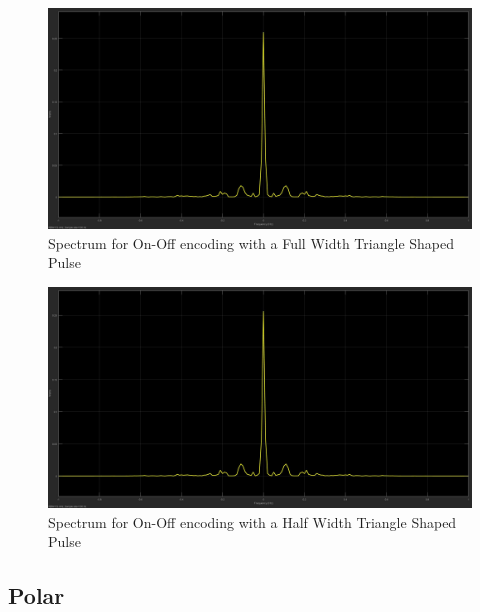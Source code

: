 \documentclass{article}
\begin{document}
\begin{figure}[H]
  \includegraphics[width = \linewidth]{OO_Tri_F_Spectrum.jpg}
  \caption{Spectrum for On-Off encoding with a Full Width Triangle Shaped Pulse}
  \label{fig:OO-Tri-F-Spectrum}
\end{figure}
\begin{figure}[H]
  \includegraphics[width = \linewidth]{OO_Tri_H_Spectrum.jpg}
  \caption{Spectrum for On-Off encoding with a Half Width Triangle Shaped Pulse}
  \label{fig:OO-Tri-H-Spectrum}
\end{figure}
\subsection{Polar}
\end{document}
